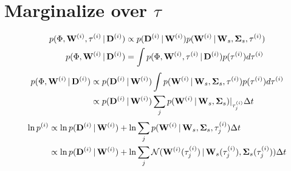 \documentclass[letterpaper,12pt,preprint]{aastex}
\newcommand{\given}{\,|\,}
\newcommand{\D}{{\bf D}}
\newcommand{\W}{{\bf W}}
\newcommand{\bSigma}{{\bf \Sigma}}
\begin{document}
\section{Marginalize over $\tau$}
\begin{align}
	p(\Phi, \W^{(i)}, \tau^{(i)} \given \D^{(i)}) &\propto 
		p(\D^{(i)} \given \W^{(i)}) p(\W^{(i)} \given \W_s, \bSigma_s, \tau^{(i)})\\
	p(\Phi, \W^{(i)} \given \D^{(i)}) &= \int p(\Phi, \W^{(i)}, \tau^{(i)} \given \D^{(i)}) p(\tau^{(i)}) d\tau^{(i)}
\end{align}	
\begin{align}
	p(\Phi, \W^{(i)} \given \D^{(i)}) &\propto p(\D^{(i)} \given \W^{(i)}) \int p(\W^{(i)} \given \W_s, \bSigma_s, \tau^{(i)}) p(\tau^{(i)}) d\tau^{(i)}\\
	&\propto p(\D^{(i)} \given \W^{(i)}) \sum_j p(\W^{(i)} \given \W_s, \bSigma_s)|_{\tau^{(i)}_j} \Delta t
\end{align}
\begin{align}
	\ln p^{(i)} &\propto \ln p(\D^{(i)} \given \W^{(i)}) + \ln \sum_j p(\W^{(i)} \given \W_s, \bSigma_s, \tau^{(i)}_j) \Delta t\\
	&\propto \ln p(\D^{(i)} \given \W^{(i)}) + \ln \sum_j \mathcal{N}(\W^{(i)}( \tau^{(i)}_j) \given \W_s( \tau^{(i)}_j), \bSigma_s( \tau^{(i)}_j)) \Delta t\\
\end{align}
\end{document}
